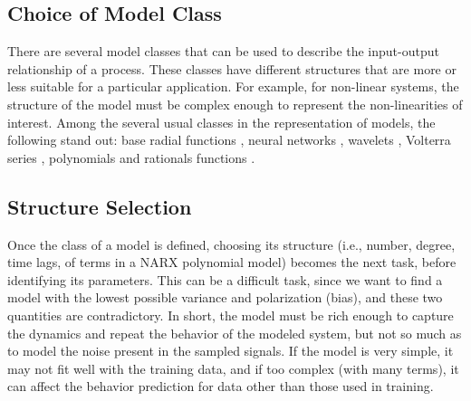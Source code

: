 \subsection{Choice of Model Class} \label{sec:choose model}

There are several model classes that can be used to describe the input-output relationship of a process. These classes have different structures that are more or less suitable for a particular application. For example, for non-linear systems, the structure of the model must be complex enough to represent the non-linearities of interest. Among the several usual classes in the representation of models, the following stand out: base radial functions \citep{broomhead1988}, neural networks \citep{haykin1994}, wavelets \citep{strang1989}, Volterra series \citep{billings1980}, polynomials and rationals functions \citep{billings1989}.

\subsection{Structure Selection}\label{sec:estr_selection}

Once the class of a model is defined, choosing its structure (i.e., number, degree, time lags, of terms in a NARX polynomial model) becomes the next task, before identifying its parameters.
This can be a difficult task, since we want to find a model with the lowest possible variance and polarization (bias), and these two quantities are contradictory.
In short, the model must be rich enough to capture the dynamics and repeat the behavior of the modeled system, but not so much as to model the noise present in the sampled signals.
If the model is very simple, it may not fit well with the training data, and if too complex (with many terms), it can affect the behavior prediction for data other than those used in training.

